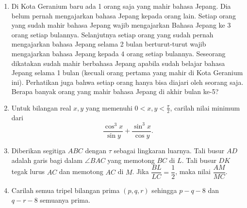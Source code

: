 \documentclass{article}
\begin{document}
\begin{enumerate}[resume]
		\item Di Kota Geranium baru ada 1 orang saja yang mahir bahasa Jepang. Dia belum pernah mengajarkan bahasa Jepang kepada orang lain. Setiap orang yang sudah mahir bahasa Jepang wajib mengajarkan Bahasa Jepang ke 3 orang setiap bulannya. Selanjutnya setiap orang yang sudah pernah mengajarkan bahasa Jepang selama 2 bulan berturut-turut wajib mengajarkan bahasa Jepang kepada 4 orang setiap bulannya. Seseorang dikatakan sudah mahir berbahasa Jepang apabila sudah belajar bahasa Jepang selama 1 bulan (kecuali orang pertama yang mahir di Kota Geranium ini). Perhatikan juga bahwa setiap orang hanya bisa diajari oleh seorang saja. Berapa banyak orang yang mahir bahasa Jepang di akhir bulan ke-5?
		
		\item Untuk bilangan real $x,y$ yang memenuhi $0 < x,y < \frac{\pi}{2}$, carilah nilai minimum dari $$\frac{\cos^3 x}{\sin y}+\frac{\sin^3 x}{\cos y}.$$
		
		\item Diberikan segitiga $ABC$ dengan $\tau$ sebagai lingkaran luarnya. Tali busur $AD$ adalah garis bagi dalam $\angle BAC$ yang memotong $BC$ di $L$. Tali busur $DK$ tegak lurus $AC$ dan memotong $AC$ di $M$. Jika $\dfrac{BL}{LC}=\dfrac12$, maka nilai $\dfrac{AM}{MC}$.
		
		\item Carilah semua tripel bilangan prima $(p,q,r)$ sehingga $p-q-8$ dan $q-r-8$ semuanya prima.
\end{enumerate}
\end{document}
